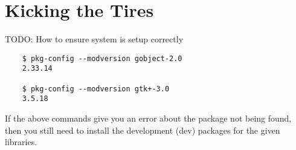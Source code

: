 \section{Kicking the Tires}

TODO: How to ensure system is setup correctly

\begin{Verbatim}
    $ pkg-config --modversion gobject-2.0
    2.33.14

    $ pkg-config --modversion gtk+-3.0
    3.5.18
\end{Verbatim}

If the above commands give you an error about the package not being found,
then you still need to install the development (dev) packages for the given
libraries.
